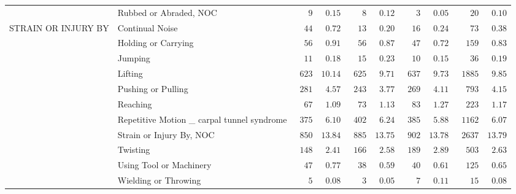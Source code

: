 \documentclass[9pt, oneside]{article}   	%
\begin{document}
\begin{longtable}{p{1.8in}p{2.2in}cccccccc}
 & Rubbed or Abraded, NOC  & $\phantom{000}9$ & $\phantom{0}0.15$ & $\phantom{000}8$ & $\phantom{0}0.12$ & $\phantom{000}3$ & $\phantom{0}0.05$ & $\phantom{000}20$ & $\phantom{0}0.10$ \\
STRAIN OR INJURY BY & Continual Noise  & $\phantom{00}44$ & $\phantom{0}0.72$ & $\phantom{00}13$ & $\phantom{0}0.20$ & $\phantom{00}16$ & $\phantom{0}0.24$ & $\phantom{000}73$ & $\phantom{0}0.38$ \\
 & Holding or Carrying  & $\phantom{00}56$ & $\phantom{0}0.91$ & $\phantom{00}56$ & $\phantom{0}0.87$ & $\phantom{00}47$ & $\phantom{0}0.72$ & $\phantom{00}159$ & $\phantom{0}0.83$ \\
 & Jumping  & $\phantom{00}11$ & $\phantom{0}0.18$ & $\phantom{00}15$ & $\phantom{0}0.23$ & $\phantom{00}10$ & $\phantom{0}0.15$ & $\phantom{000}36$ & $\phantom{0}0.19$ \\
 & Lifting  & $\phantom{0}623$ & $10.14$ & $\phantom{0}625$ & $\phantom{0}9.71$ & $\phantom{0}637$ & $\phantom{0}9.73$ & $\phantom{0}1885$ & $\phantom{0}9.85$ \\
 & Pushing or Pulling  & $\phantom{0}281$ & $\phantom{0}4.57$ & $\phantom{0}243$ & $\phantom{0}3.77$ & $\phantom{0}269$ & $\phantom{0}4.11$ & $\phantom{00}793$ & $\phantom{0}4.15$ \\
 & Reaching  & $\phantom{00}67$ & $\phantom{0}1.09$ & $\phantom{00}73$ & $\phantom{0}1.13$ & $\phantom{00}83$ & $\phantom{0}1.27$ & $\phantom{00}223$ & $\phantom{0}1.17$ \\
 & Repetitive Motion \_ carpal tunnel syndrome  & $\phantom{0}375$ & $\phantom{0}6.10$ & $\phantom{0}402$ & $\phantom{0}6.24$ & $\phantom{0}385$ & $\phantom{0}5.88$ & $\phantom{0}1162$ & $\phantom{0}6.07$ \\
 & Strain or Injury By, NOC  & $\phantom{0}850$ & $13.84$ & $\phantom{0}885$ & $13.75$ & $\phantom{0}902$ & $13.78$ & $\phantom{0}2637$ & $13.79$ \\
 & Twisting  & $\phantom{0}148$ & $\phantom{0}2.41$ & $\phantom{0}166$ & $\phantom{0}2.58$ & $\phantom{0}189$ & $\phantom{0}2.89$ & $\phantom{00}503$ & $\phantom{0}2.63$ \\
 & Using Tool or Machinery  & $\phantom{00}47$ & $\phantom{0}0.77$ & $\phantom{00}38$ & $\phantom{0}0.59$ & $\phantom{00}40$ & $\phantom{0}0.61$ & $\phantom{00}125$ & $\phantom{0}0.65$ \\
 & Wielding or Throwing  & $\phantom{000}5$ & $\phantom{0}0.08$ & $\phantom{000}3$ & $\phantom{0}0.05$ & $\phantom{000}7$ & $\phantom{0}0.11$ & $\phantom{000}15$ & $\phantom{0}0.08$ \\

\end{longtable}
\end{document}
